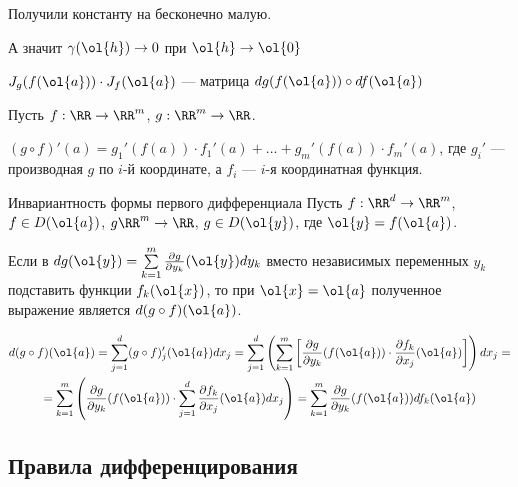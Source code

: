 Получили константу на бесконечно малую.

А значит \( \gamma(\ol{h}) \to 0 \) при \( \ol{h} \to \ol{0} \)

\begin{coroll}{}{}
    \( J_g (f(\ol{a})) \cdot J_f (\ol{a}) \) --- матрица \( dg(f(\ol{a})) \circ df (\ol{a}) \)
\end{coroll}

Пусть \( f : \RR \to \RR^m \), \( g : \RR^m \to \RR \).

\( (g \circ f)' (a) = g_1'(f(a)) \cdot f_1'(a) + \ldots + g_m'(f(a)) \cdot f_m'(a) \),
где \( g_i' \) --- производная \( g \) по \( i \)-й координате, а \( f_i \) --- \( i \)-я координатная функция.

\begin{thrm}{Инвариантность формы первого дифференциала}{}
    Пусть \( f : \RR^d \to \RR^m \), \( f \in D(\ol{a}) \), \( g \RR^m \to \RR \), \( g \in D(\ol{y}) \), где \( \ol{y} = f(\ol{a}) \).

    Если в \( dg(\ol{y}) = \sum\limits_{k = 1}^{m} \frac{\partial g}{\partial y_k} (\ol{y}) dy_k \)
    вместо независимых переменных \( y_k \) подставить функции \( f_k(\ol{x}) \),
    то при \( \ol{x} = \ol{a} \) полученное выражение является \( d(g \circ f)(\ol{a}) \).
\end{thrm}

\begin{gather*}
    d(g \circ f)(\ol{a})
    =
    \sum\limits_{j = 1}^{d} (g \circ f)_j' (\ol{a}) dx_j
    =
    \sum\limits_{j = 1}^{d}
        \left(
            \sum\limits_{k = 1}^{m}
            \left[
                \frac{\partial g}{\partial y_k} (f(\ol{a})) \cdot \frac{\partial f_k}{\partial x_j} (\ol{a})
            \right]
        \right) dx_j
    =
    \\
    =
    \sum\limits_{k = 1}^{m}
        \left(
            \frac{\partial g}{\partial y_k} (f(\ol{a}))
            \cdot
            \sum\limits_{j = 1}^{d}
                 \frac{\partial f_k}{\partial x_j} (\ol{a})
                 dx_j
        \right)
    =
    \sum\limits_{k = 1}^{m} \frac{\partial g}{\partial y_k} (f(\ol{a})) df_k (\ol{a})
\end{gather*}

\subsection{Правила дифференцирования}

